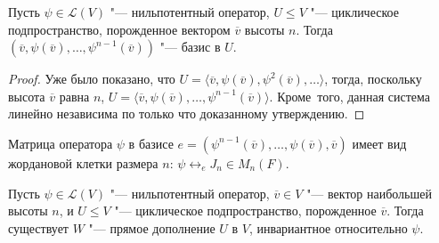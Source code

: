 \begin{corollary}
	Пусть $\psi \in \mathcal{L}(V)$ "--- нильпотентный оператор, $U \le V$ "--- циклическое подпространство, порожденное вектором $\overline{v}$ высоты $n$. Тогда $(\overline{v}, \psi(\overline{v}), \dots, \psi^{n-1}(\overline{v}))$ "--- базис в $U$.
\end{corollary}

\begin{proof}
	Уже было показано, что $U = \langle\overline{v}, \psi(\overline{v}), \psi^2(\overline{v}), \dots\rangle$, тогда, поскольку высота $\overline{v}$ равна $n$, $U = \langle\overline{v}, \psi(\overline{v}), \dots, \psi^{n - 1}(\overline{v})\rangle$. Кроме~того, данная система линейно независима по только что доказанному утверждению.
\end{proof}

\begin{note}
	Матрица оператора $\psi$ в базисе $e = (\psi^{n-1}(\overline{v}), \dots, \psi(\overline{v}), \overline{v})$ имеет вид жордановой клетки размера $n$: $\psi \leftrightarrow_e J_n \in M_n(F)$.
\end{note}

\begin{proposition}
	Пусть $\psi \in \mathcal{L}(V)$ "--- нильпотентный оператор, $\overline{v} \in V$ "--- вектор наибольшей высоты $n$, и $U \le V$ "--- циклическое подпространство, порожденное $\overline{v}$. Тогда существует $W$ "--- прямое дополнение $U$ в $V$, инвариантное относительно $\psi$.
\end{proposition}

